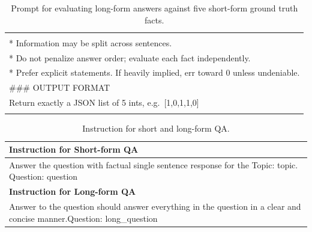 \documentclass[11pt]{article}
\begin{document}
\begin{table}[t]
\begin{tabular}{@{}p{\textwidth}@{}}
{**Handling Complexities:**\\
* Information may be split across sentences.\\
* Do not penalize answer order; evaluate each fact independently.\\
* Prefer explicit statements. If heavily implied, err toward 0 unless undeniable.\\
\#\#\# OUTPUT FORMAT\\
Return exactly a JSON list of 5 ints, e.g.\ [1,0,1,1,0]\\
}\\
\hline
\end{tabular}
\caption{Prompt for evaluating long-form answers against five short-form ground truth facts.}
\label{tab:prompts-long-form-eval}
\end{table}

\begin{table}[t]
\centering
\begin{tabular}{@{}p{\textwidth}@{}}
\hline
\textbf{Instruction for Short-form QA} \\
\hline \hline
{\raggedright\ttfamily
Answer the question with factual single sentence response for the Topic: {topic}. Question: {question}
}\\
\hline
\textbf{Instruction for Long-form QA} \\
\hline \hline
{\raggedright\ttfamily
Answer to the question should answer everything in the question in a clear and concise manner.Question: {long\_question}
}\\
\hline
\end{tabular}
\caption{Instruction for short and long-form QA.}
\label{tab:instruct-short-long}
\end{table}
\end{document}

